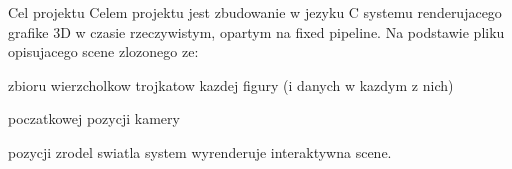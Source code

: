 \begin{DoxyParagraph}{Cel projektu}
Celem projektu jest zbudowanie w jezyku C systemu renderujacego grafike 3\-D w czasie rzeczywistym, opartym na fixed pipeline.  Na podstawie pliku opisujacego scene zlozonego ze\-:
\begin{DoxyItemize}
\item zbioru wierzcholkow trojkatow kazdej figury (i danych w kazdym z nich)
\item poczatkowej pozycji kamery
\item pozycji zrodel swiatla system wyrenderuje interaktywna scene. 
\end{DoxyItemize}
\end{DoxyParagraph}
